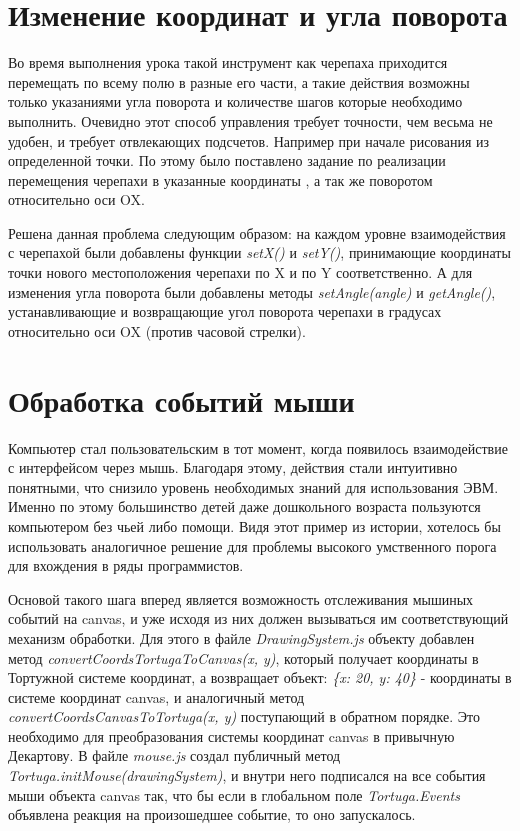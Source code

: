 \section{Изменение координат и угла поворота} \label{sect1_1}
Во время выполнения урока такой инструмент как черепаха приходится перемещать по всему полю в разные его части, а такие действия возможны только указаниями угла поворота и количестве шагов которые необходимо выполнить. Очевидно этот способ управления требует точности, чем весьма не удобен, и требует отвлекающих подсчетов. Например при начале рисования из определенной точки. По этому было поставлено задание по реализации перемещения черепахи в указанные координаты , а так же поворотом относительно оси OX.

Решена данная проблема следующим образом: на каждом уровне взаимодействия с  черепахой были добавлены функции \textit{setX()} и \textit{setY()},  принимающие координаты точки нового местоположения черепахи по X и по Y  соответственно. А для изменения угла поворота были добавлены методы \textit{setAngle(angle)} и \textit{getAngle()}, устанавливающие и возвращающие угол поворота черепахи в градусах относительно оси OX (против часовой стрелки). 



\section{Обработка событий мыши} \label{sect1_1}

Компьютер стал пользовательским в тот момент, когда появилось взаимодействие с интерфейсом через мышь. Благодаря этому, действия стали интуитивно понятными, что снизило уровень необходимых знаний для использования ЭВМ. Именно по этому большинство детей даже дошкольного возраста пользуются компьютером без чьей либо помощи. Видя этот пример из истории, хотелось бы использовать аналогичное решение для проблемы высокого умственного порога для вхождения в ряды программистов. 

Основой такого шага вперед является возможность отслеживания мышиных событий на canvas, и уже исходя из них должен вызываться им соответствующий механизм обработки. Для этого в файле \textit{DrawingSystem.js}  объекту добавлен  метод \textit{convertCoordsTortugaToCanvas(x, y)}, который получает координаты в Тортужной системе координат, а возвращает объект: \textit{\{x: 20, y: 40\}} - координаты в системе координат canvas, и аналогичный метод \textit{convertCoordsCanvasToTortuga(x, y)}  поступающий в обратном порядке. Это необходимо для  преобразования системы координат canvas  в привычную Декартову. В файле \textit{mouse.js} создал публичный метод \textit{Tortuga.initMouse(drawingSystem)}, и внутри него подписался на все события мыши объекта canvas так, что бы если в глобальном поле \textit{Tortuga.Events} объявлена реакция на произошедшее событие, то оно запускалось. 

